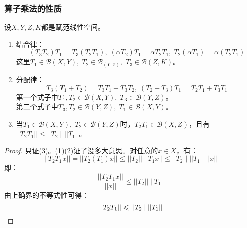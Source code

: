 \subsubsection{算子乘法的性质}
\begin{property}
	设$X,Y,Z,K$都是赋范线性空间。
	\begin{enumerate}
		\item 结合律：
		\begin{equation*}
			(T_3T_2)T_1=T_3(T_2T_1),\;(\alpha T_2)T_1=\alpha T_2T_1,\;
			T_2(\alpha T_1)=\alpha(T_2T_1)
		\end{equation*}
		这里$T_1\in\mathscr{B}(X,Y),\;T_2\in\mathscr{B}_(Y,Z),\;T_3\in\mathscr{B}(Z,K)$。
		\item 分配律：
		\begin{equation*}
			T_3(T_1+T_2)=T_3T_1+T_3T_2,\;(T_2+T_3)T_1=T_2T_1+T_3T_1
		\end{equation*}
		第一个式子中$T_1,T_2\in\mathscr{B}(X,Y),\;T_3\in\mathscr{B}(Y,Z)$。\\
		第二个式子中$T_3,T_2\in\mathscr{B}(Y,Z),\;T_1\in\mathscr{B}(X,Y)$。
		\item 当$T_1\in\mathscr{B}(X,Y),\;T_2\in\mathscr{B}(Y,Z)$时，$T_2T_1\in\mathscr{B}(X,Z)$，且有$||T_2T_1||\leqslant||T_2||\;||T_1||$。
	\end{enumerate}
\end{property}
\begin{proof}
	只证(3)。(1)(2)证了没多大意思。对任意的$x\in X$，有：
	\begin{equation*}
		||T_2T_1x||=||T_2(T_1)x||\leqslant||T_2||\;||T_1x||\leqslant||T_2||\;||T_1||\;||x||
	\end{equation*}
	即：
	\begin{equation*}
		\frac{||T_2T_1x||}{||x||}\leqslant||T_2||\;||T_1||
	\end{equation*}
	由上确界的不等式性可得：
	\begin{equation*}
		||T_2T_1||\leqslant||T_2||\;||T_1||\qedhere
	\end{equation*}
\end{proof}






















